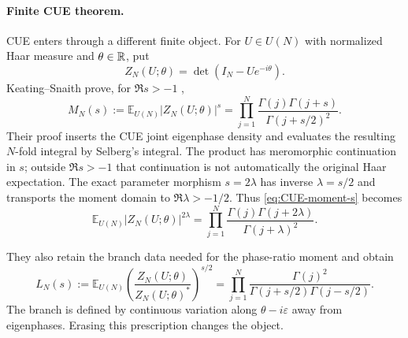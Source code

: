 \paragraph{Finite CUE theorem.}
CUE enters through a different finite object.  For $U\in U(N)$ with normalized Haar measure
and $\theta\in\mathbb R$, put
\begin{equation}
 Z_N(U;\theta)=\det(I_N-Ue^{-i\theta}).
 \label{eq:CUE-characteristic}
\end{equation}
Keating--Snaith prove, for $\Re s>-1$
\cite[pp.~57--64, eqs.~(1), (6), and~(20)--(26)]{keatingSnaith2000},
\begin{equation}
 M_N(s):=\mathbb E_{U(N)}|Z_N(U;\theta)|^s
 =\prod_{j=1}^N
 \frac{\Gamma(j)\Gamma(j+s)}{\Gamma(j+s/2)^2}.
 \label{eq:CUE-moment-s}
\end{equation}
Their proof inserts the CUE joint eigenphase density and evaluates the resulting $N$-fold
integral by Selberg's integral.  The product has meromorphic continuation in $s$; outside
$\Re s>-1$ that continuation is not automatically the original Haar expectation.  The exact
parameter morphism $s=2\lambda$ has inverse $\lambda=s/2$ and transports the moment domain
to $\Re\lambda>-1/2$.  Thus \eqref{eq:CUE-moment-s} becomes
\begin{equation}
 \mathbb E_{U(N)}|Z_N(U;\theta)|^{2\lambda}
 =\prod_{j=1}^N
 \frac{\Gamma(j)\Gamma(j+2\lambda)}{\Gamma(j+\lambda)^2}.
 \label{eq:CUE-moment}
\end{equation}

They also retain the branch data needed for the phase-ratio moment and obtain
\cite[eqs.~(7) and~(27)--(33)]{keatingSnaith2000}
\begin{equation}
 L_N(s):=\mathbb E_{U(N)}
 \left(\frac{Z_N(U;\theta)}{Z_N(U;\theta)^*}\right)^{s/2}
 =\prod_{j=1}^N
 \frac{\Gamma(j)^2}{\Gamma(j+s/2)\Gamma(j-s/2)}.
 \label{eq:CUE-phase-moment}
\end{equation}
The branch is defined by continuous variation along $\theta-i\varepsilon$ away from
eigenphases.  Erasing this prescription changes the object.

